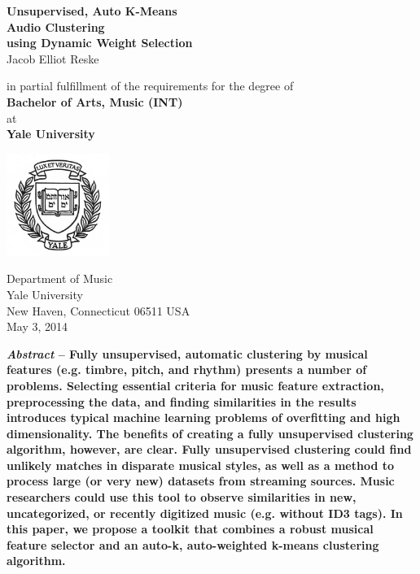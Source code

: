 \documentclass[12pt,twocolumn,titlepage]{article}
\begin{document}
\begin{titlepage}
\thispagestyle{empty}

    \begin{center}
        
        \Huge
        \textbf{Unsupervised, Auto K-Means \\Audio Clustering\\using Dynamic Weight Selection} \\
        \vspace{0.5cm}
        \Large
        Jacob Elliot Reske
        \Large

        \vspace{1.5cm}
        
        \large
        in partial fulfillment of the requirements for the degree of\\
        \textbf{Bachelor of Arts, Music (INT)}\\
        at\\
        \textbf{Yale University}
        \large
        \vspace{5cm}
        
        \includegraphics[width=0.25\textwidth]{yale}
        
        \Large
        \small
        Department of Music\\
        Yale University\\
        New Haven, Connecticut 06511 USA \\
        May 3, 2014
        \small
    \end{center}
\end{titlepage}


\textbf{\emph{Abstract} -- Fully unsupervised, automatic clustering by musical features (e.g. timbre, pitch, and rhythm) presents a number of problems. Selecting essential criteria for music feature extraction, preprocessing the data, and finding similarities in the results introduces typical machine learning problems of overfitting and high dimensionality. The benefits of creating a fully unsupervised clustering algorithm, however, are clear. Fully unsupervised clustering could find unlikely matches in disparate musical styles, as well as a method to process large (or very new) datasets from streaming sources. Music researchers could use this tool to observe similarities in new, uncategorized, or recently digitized music (e.g. without ID3 tags). In this paper, we propose a toolkit that combines a robust musical feature selector and an auto-k, auto-weighted k-means clustering algorithm.}
\end{document}
